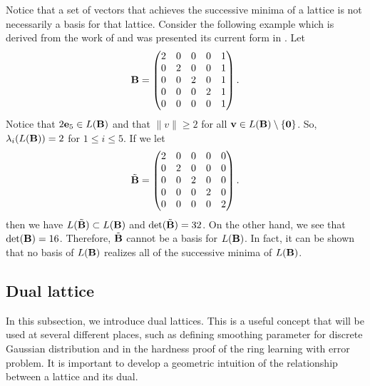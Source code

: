 \documentclass[../main.tex]{subfiles}
\begin{document}
Notice that a set of vectors that achieves the successive minima of a lattice is not necessarily a basis for that lattice. Consider the following example which is derived from the work of \cite{korkine1873} and was presented its current form in \cite{nguyen2010}. Let
\begin{equation*}
    \mathbf{B} = \begin{pmatrix}
        2 & 0 & 0 & 0 & 1 \\
        0 & 2 & 0 & 0 & 1 \\
        0 & 0 & 2 & 0 & 1 \\
        0 & 0 & 0 & 2 & 1 \\
        0 & 0 & 0 & 0 & 1 
    \end{pmatrix}.
\end{equation*}
Notice that $2\mathbf{e}_5 \in L(\mathbf{B})$ and that $\lVert v \rVert \geq 2$ for all $\mathbf{v} \in L(\mathbf{B}) \setminus \{\mathbf{0}\}$.  So, $\lambda_i(L(\mathbf{B})) = 2$  for $1 \leq i \leq 5$. If we let
\begin{equation*}
    \tilde{\mathbf{B}} = \begin{pmatrix}
        2 & 0 & 0 & 0 & 0 \\
        0 & 2 & 0 & 0 & 0 \\
        0 & 0 & 2 & 0 & 0 \\
        0 & 0 & 0 & 2 & 0 \\
        0 & 0 & 0 & 0 & 2 
    \end{pmatrix}.
\end{equation*}
then we have $L(\tilde{\mathbf{B}}) \subset L(\mathbf{B})$ and $\det(\tilde{\mathbf{B}}) = 32$. On the other hand, we see that $\det(\mathbf{B}) = 16$. Therefore, $\tilde{\mathbf{B}}$ cannot be a basis for $L(\mathbf{B})$. In fact, it can be shown that no basis of $L(\mathbf{B})$ realizes all of the successive minima of $L(\mathbf{B})$.




\subsection{Dual lattice}

In this subsection, we introduce dual lattices. This is a useful concept that will be used at several different places, such as defining smoothing parameter for discrete Gaussian distribution and in the hardness proof of the ring learning with error problem. It is important to develop a geometric intuition of the relationship between a lattice and its dual. %
\end{document}

